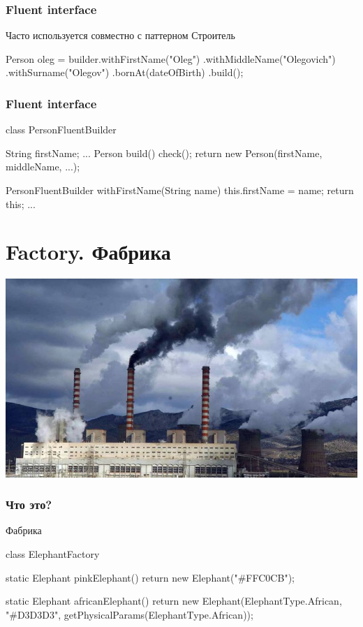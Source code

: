 \documentclass[russian,aspectratio=169,14pt]{beamer}
\begin{document}
\begin{frame}[fragile]
	\frametitle{Fluent interface}
	Часто используется совместно с паттерном Строитель
	\vfill
\begin{listjava}
Person oleg = builder.withFirstName("Oleg")
					.withMiddleName("Olegovich")
					.withSurname("Olegov")
					.bornAt(dateOfBirth)
					.build();
\end{listjava}	
\end{frame}

\begin{frame}[fragile]
	\frametitle{Fluent interface}
\begin{listjava}
class PersonFluentBuilder {
    String firstName;
    ...
    Person build() {
        check();
        return new Person(firstName, middleName, ...);
    }
    
    PersonFluentBuilder withFirstName(String name) {
        this.firstName = name;
        return this;
    }
    ...
}
\end{listjava}	
\end{frame}




\section{Factory. Фабрика}

\begin{frame}
    \begin{center}
	\includegraphics[height=0.8\textheight]{fabric.jpg}
	\end{center}
\end{frame}

\begin{frame}[fragile]
	\frametitle{Что это?}
	Фабрика
	\begin{listjava}
class ElephantFactory {
    static Elephant pinkElephant() {
        return new Elephant("#FFC0CB");
    }
    
    static Elephant africanElephant() {
        return new Elephant(ElephantType.African, "#D3D3D3", 
            getPhysicalParams(ElephantType.African));
    }
}
	\end{listjava}
\end{frame}
\end{document}
